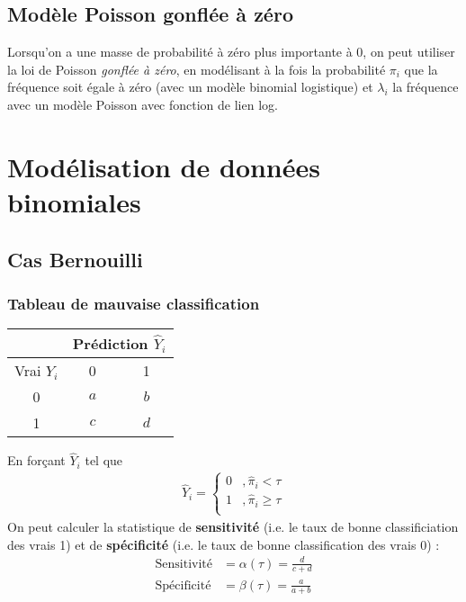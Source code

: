 \documentclass[10pt, french]{article}
\begin{document}
\begin{multicols*}{3}
\subsection*{Modèle Poisson gonflée à zéro}
Lorsqu'on a une masse de probabilité à zéro plus importante à 0, on peut utiliser la loi de Poisson \emph{gonflée à zéro}, en modélisant à la fois la probabilité $\pi_i$ que la fréquence soit égale à zéro (avec un modèle binomial logistique) et $\lambda_i$ la fréquence avec un modèle Poisson avec fonction de lien log.


\section{Modélisation de données binomiales}





\subsection{Cas Bernouilli}

\subsubsection*{Tableau de mauvaise classification}
\begin{center}
\begin{tabular}{|c|c|c|}
\hline
  & \multicolumn{2}{c|}{Prédiction $\hat{Y}_i$} \\ \hline
Vrai $Y_i$ & 0 & 1 \\ 
  \hline
0 & $a$ & $b$ \\ 
  1 & $c$ & $d$ \\ 
   \hline
\end{tabular}
\end{center}
En forçant $\hat{Y}_i$ tel que
\begin{align*}
\hat{Y}_i = 
\begin{cases}
0	& , \hat{\pi}_i < \tau \\
1	& , \hat{\pi}_i \geq \tau \\
\end{cases}
\end{align*}
On peut calculer la statistique de \textbf{sensitivité} (i.e. le taux de bonne classificiation des vrais 1) et de \textbf{spécificité} (i.e. le taux de bonne classification des vrais 0) : 
\begin{align*}
\text{Sensitivité}	& = \alpha(\tau) = \frac{d}{c+d} \\
\text{Spécificité}	& = \beta(\tau) = \frac{a}{a+b} \\
\end{align*}






\end{multicols*}
\end{document}
